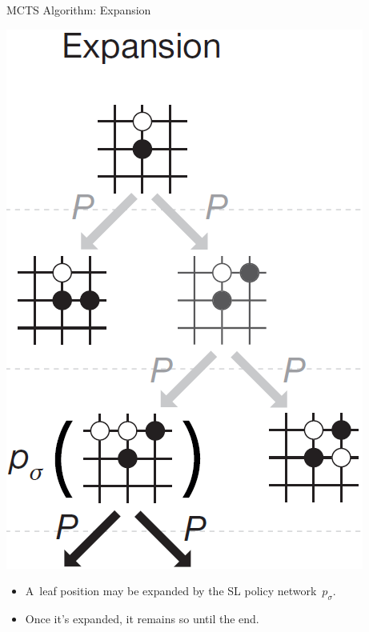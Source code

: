 \documentclass{beamer}
\begin{document}
{    \begin{frame}{MCTS Algorithm: Expansion}
      \begin{center}
        \includegraphics[height=.6\textheight]{../img/MCTS_expansion.png}
      \end{center}
      \pause

      \begin{itemize}[<+- | alert@+>]
        \item A~leaf position may be expanded by the SL policy network~$p_\sigma$.
        \item Once it's expanded, it remains so until the end.
      \end{itemize}
    \end{frame}

}
\end{document}
